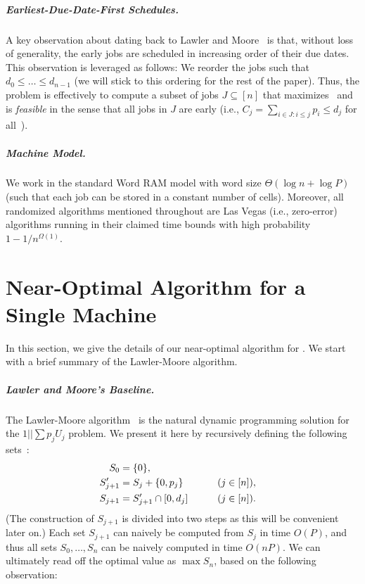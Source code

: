 \documentclass[10pt,a4paper]{article}
\DeclarePairedDelimiter\set{\lbrace}{\rbrace}
\newcommand\Order{O}
\newcommand\MTPT{\smash{$1||\sum p_j U_j$}}
\begin{document}
\subparagraph{Earliest-Due-Date-First Schedules.}
A key observation about \MTPT{} dating back to Lawler and Moore~\cite{LawlerM69} is that, without loss of generality, the early jobs are scheduled in increasing order of their due dates. This observation is leveraged as follows: We reorder the jobs such that $d_0 \leq \dots \leq d_{n-1}$ (we will stick to this ordering for the rest of the paper). Thus, the \MTPT{} problem is effectively to compute a subset of jobs $J \subseteq [n]$ that maximizes~ and is \emph{feasible} in the sense that all jobs in $J$ are early (i.e., $C_j = \sum_{i \in J : i \leq j} p_i \leq d_j$ for all~).

\subparagraph{Machine Model.}
We work in the standard Word RAM model with word size $\Theta(\log n + \log P)$ (such that each job can be stored in a constant number of cells). Moreover, all randomized algorithms mentioned throughout are Las Vegas (i.e., zero-error) algorithms running in their claimed time bounds with high probability $1 - 1/n^{\Omega(1)}$.




\section{Near-Optimal Algorithm for a Single Machine}
\label{sec:algorithm-for-one-machine}

In this section, we give the details of our near-optimal algorithm for \MTPT{}. We start with a brief summary of the Lawler-Moore algorithm. 

\subparagraph{Lawler and Moore's Baseline.}
The Lawler-Moore algorithm~\cite{LawlerM69} is the natural dynamic programming solution for the $1||\sum p_j U_j$ problem. We present it here by recursively defining the following sets~:
\begin{alignat*}{2}
    S_0 &= \set{0}, \\
    S'_{j+1} &=  S_{j} + \set{0, p_j} \qquad && (j \in [n]), \\
    S_{j+1} &= S'_{j+1} \cap [0,d_{j}]  \qquad && (j \in [n]).
\end{alignat*}
(The construction of $S_{j+1}$ is divided into two steps as this will be convenient later on.) Each set $S_{j+1}$ can naively be computed from $S_j$ in time $\Order(P)$, and thus all sets $S_0, \dots, S_n$ can be naively computed in time $\Order(nP)$. We can ultimately read off the optimal value as $\max S_n$, based on the following observation:
\end{document}
